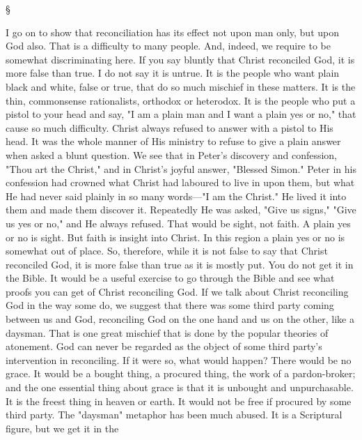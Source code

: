 \documentclass[12pt,a5paper,twoside,titlepage]{book}
\begin{document}
\begin{center}
\S
\end{center}

I go on to show that reconciliation has its 
effect not upon man only, but upon God also. 
That is a difficulty to many people. And, indeed, 
we require to be somewhat discriminating here. 
If you say bluntly that Christ reconciled God, 
it is more false than true. I do not say it 
is untrue. It is the people who want plain 
black and white, false or true, that do so much 
mischief in these matters. It is the thin, 
commonsense rationalists, orthodox or heterodox. 
It is the people who put a pistol to your 
head and say, "I am a plain man and I 
want a plain yes or no," that cause so 
much difficulty. Christ always refused to 
answer with a pistol to His head. It was the 
whole manner of His ministry to refuse to give 
a plain answer when asked a blunt question. 
We see that in Peter's discovery and confession, 
"Thou art the Christ," and in Christ's joyful 
answer, "Blessed Simon." Peter in his confession 
had crowned what Christ had laboured 
to live in upon them, but what He had never 
said plainly in so many words---"I am the 
Christ." He lived it into them and made them 
discover it. Repeatedly He was asked, "Give us 
signs," "Give us yes or no," and He always 
refused. That would be sight, not faith. A 
plain yes or no is sight. But faith is insight 
into Christ. In this region a plain yes or no 
is somewhat out of place. So, therefore, while 
it is not false to say that Christ reconciled 
God, it is more false than true as it is mostly 
put. You do not get it in the Bible. It would 
be a useful exercise to go through the Bible 
and see what proofs you can get of Christ 
reconciling God. If we talk about Christ reconciling 
God in the way some do, we suggest that 
there was some third party coming between us 
and God, reconciling God on the one hand and 
us on the other, like a daysman. That is one 
great mischief that is done by the popular 
theories of atonement. God can never be 
regarded as the object of some third party's 
intervention in reconciling. If it were so, what 
would happen? There would be no grace. It 
would be a bought thing, a procured thing, 
the work of a pardon-broker; and the one 
essential thing about grace is that it is unbought 
and unpurchasable. It is the freest 
thing in heaven or earth. It would not be 
free if procured by some third party. The 
"daysman" metaphor has been much abused. 
It is a Scriptural figure, but we get it in the 
\end{document}
